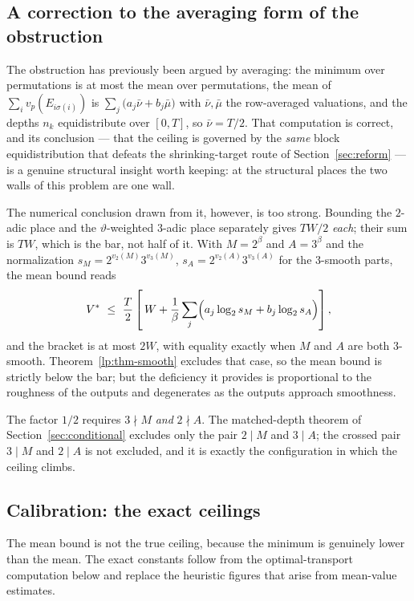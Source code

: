 \documentclass[11pt,oneside]{article}
\theoremstyle{definition}
\theoremstyle{remark}
\newcommand{\thetaq}{\vartheta}
\newcommand{\vpp}[2]{v_{#1}\!\left(#2\right)}
\begin{document}
\subsection{A correction to the averaging form of the obstruction}

The obstruction has previously been argued by averaging: the minimum over permutations is at
most the mean over permutations, the mean of $\sum_iv_p(E_{i\sigma(i)})$ is
$\sum_j\bigl(a_j\bar\nu+b_j\bar\mu\bigr)$ with $\bar\nu,\bar\mu$ the row-averaged valuations,
and the depths $n_k$ equidistribute over $[0,T]$, so $\bar\nu=T/2$.  That computation is
correct, and its conclusion --- that the ceiling is governed by the \emph{same} block
equidistribution that defeats the shrinking-target route of Section~\ref{sec:reform} --- is a
genuine structural insight worth keeping: at the structural places the two walls of this
problem are one wall.

The numerical conclusion drawn from it, however, is too strong.  Bounding the $2$-adic place
and the $\thetaq$-weighted $3$-adic place separately gives $TW/2$ \emph{each}; their sum is
$TW$, which is the bar, not half of it.  With $M=2^{\beta}$ and $A=3^{\beta}$ and the
normalization $s_M=2^{\vpp2M}3^{\vpp3M}$, $s_A=2^{\vpp2A}3^{\vpp3A}$ for the $3$-smooth parts,
the mean bound reads
\begin{equation}
  V^{*}\ \le\ \frac{T}{2}\left[\,W+\frac1\beta\sum_j\Bigl(a_j\log_2s_M+b_j\log_2s_A\Bigr)\right],
  \label{eq:mp-mean}
\end{equation}
and the bracket is at most $2W$, with equality exactly when $M$ and $A$ are both $3$-smooth.
Theorem~\ref{lp:thm-smooth} excludes that case, so the mean bound is strictly below the bar;
but the deficiency it provides is proportional to the roughness of the outputs and degenerates
as the outputs approach smoothness.

The factor $1/2$ requires $3\nmid M$ \emph{and} $2\nmid A$.  The matched-depth theorem of
Section~\ref{sec:conditional} excludes only the pair $2\mid M$ and $3\mid A$; the crossed pair
$3\mid M$ and $2\mid A$ is not excluded, and it is exactly the configuration in which the
ceiling climbs.

\subsection{Calibration: the exact ceilings}

The mean bound is not the true ceiling, because the minimum is genuinely lower than the mean.
The exact constants follow from the optimal-transport computation below and replace the
heuristic figures that arise from mean-value estimates.
\end{document}
